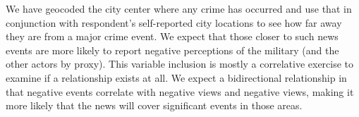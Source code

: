 We have geocoded the city center where any crime has occurred and use that in conjunction with respondent's self-reported city locations to see how far away they are from a major crime event. We expect that those closer to such news events are more likely to report negative perceptions of the military (and the other actors by proxy). This variable inclusion is mostly a correlative exercise to examine if a relationship exists at all. We expect a bidirectional relationship in that negative events correlate with negative views and negative views, making it more likely that the news will cover significant events in those areas. 



